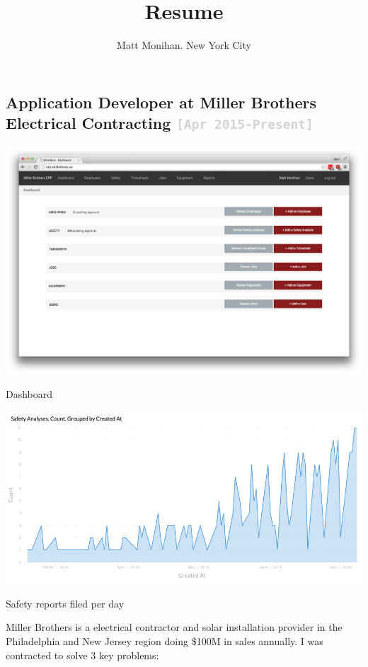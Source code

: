 \documentclass{tufte-handout}
\title{Resume}
\author{Matt Monihan. New York City}
\date{} %
\newcommand{\shstandout}[1]{\textbf{\textcolor{BurntOrange}{#1}}}
\newcommand{\shyears}[1]{\small{\texttt{\textcolor{LightGray}{#1}}}}
\begin{document}
\maketitle

\subsection{\textbf{Application Developer} at \shstandout{Miller Brothers Electrical Contracting} \shyears{[Apr 2015-Present]}}

\begin{marginfigure}%
  \includegraphics[width=\linewidth]{dashboard}
  \caption{Dashboard}
  \label{fig:dashboard}
\end{marginfigure}

\begin{marginfigure}%
  \includegraphics[width=\linewidth]{reports_by_day}
  \caption{Safety reports filed per day}
  \label{fig:reporting_dashboard}
\end{marginfigure}

Miller Brothers is a electrical contractor and solar installation provider in the Philadelphia and New Jersey region doing \$100M in sales annually. I was contracted to solve 3 key problems:
\end{document}
